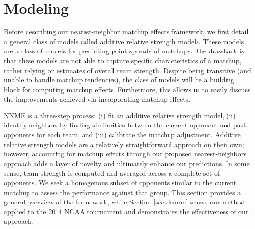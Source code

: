 \documentclass[letterpaper,12pt]{article}
\begin{document}
\section{Modeling\label{sec:NNME}}
Before describing our nearest-neighbor matchup effects framework, we first detail a general class of models called additive relative strength models. These models are a class of models for predicting point spreads of matchups. The drawback is that these models are not able to capture specific characteristics of a matchup, rather relying on estimates of overall team strength. Despite being transitive (and unable to handle matchup tendencies), the class of models will be a building block for computing matchup effects. Furthermore, this allows us to easily discuss the improvements achieved via incorporating matchup effects. 

NNME is a three-step process: (i) fit an additive relative strength model, (ii) identify neighbors by finding similarities between the current opponent and past opponents for each team, and (iii) calibrate the matchup adjustment. Additive relative strength models are a relatively straightforward approach on their own; however, accounting for matchup effects through our proposed nearest-neighbors approach adds a layer of novelty and ultimately enhance our predictions. In some sense, team strength is computed and averaged across a complete set of opponents. We seek a homogenous subset of opponents similar to the current matchup to assess the performance against that group. This section provides a general overview of the framework, while Section \ref{sec:demon} shows our method applied to the 2014 NCAA tournament and demonstrates the effectiveness of our approach.
\end{document}
